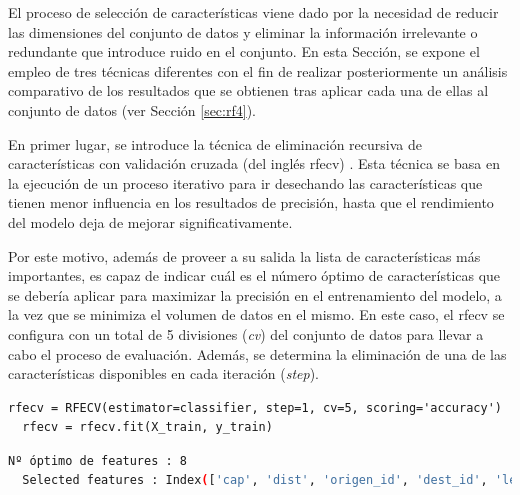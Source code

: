El proceso de selección de características viene dado por la necesidad de reducir las dimensiones del conjunto de datos y eliminar la información irrelevante o redundante que introduce ruido en el conjunto. En esta Sección, se expone el empleo de tres técnicas diferentes con el fin de realizar posteriormente un análisis comparativo de los resultados que se obtienen tras aplicar cada una de ellas al conjunto de datos (ver Sección \ref{sec:rf4}).

\vspace{3mm}

En primer lugar, se introduce la técnica de eliminación recursiva de características con validación cruzada (del inglés \gls{rfecv}) \cite{rfecv}. Esta técnica se basa en la ejecución de un proceso iterativo para ir desechando las características que tienen menor influencia en los resultados de precisión, hasta que el rendimiento del modelo deja de mejorar significativamente. 

\vspace{3mm}

Por este motivo, además de proveer a su salida la lista de características más importantes, es capaz de indicar cuál es el número óptimo de características que se debería aplicar para maximizar la precisión en el entrenamiento del modelo, a la vez que se minimiza el volumen de datos en el mismo. En este caso, el \gls{rfecv} se configura con un total de 5 divisiones (\textit{cv}) del conjunto de datos para llevar a cabo el proceso de evaluación. Además, se determina la eliminación de una de las características disponibles en cada iteración (\textit{step}). 

\vspace{3mm}

\begin{lstlisting}[style=Python, caption={Aplicación del \acrshort{rfecv}}]
  rfecv = RFECV(estimator=classifier, step=1, cv=5, scoring='accuracy') 
  rfecv = rfecv.fit(X_train, y_train)
\end{lstlisting}

\vspace{3mm}

\begin{lstlisting}[language=bash, style=Python, caption={Resultados del \acrshort{rfecv}}]
  Nº óptimo de features : 8
  Selected features : Index(['cap', 'dist', 'origen_id', 'dest_id', 'len_origen_tag', 'len_dest_tag', 'total_balance', 'abs_flux'], dtype='object')
\end{lstlisting}

